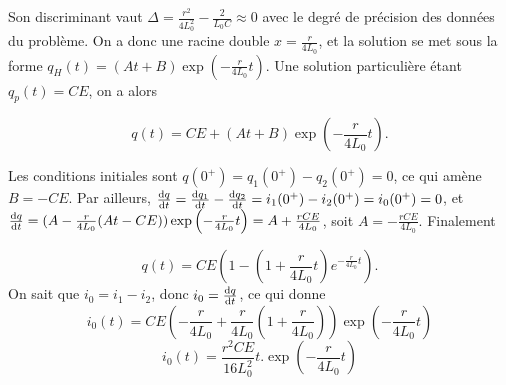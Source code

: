 \begin{solution}
\begin{questions}
                Son discriminant vaut $\Delta = \frac{r^2}{4L_0^2}-\frac{2}{L_0C} \approx 0$ avec le degré de précision des données du problème. On a donc une racine double $x=\frac{r}{4L_0}$, et la solution se met sous la forme $q_H(t) = (At+B)\exp\left(-\frac{r}{4L_0}t\right)$. Une solution particulière étant $q_p(t)=CE$, on a alors 

                \begin{equation}
                q(t) = CE+(At+B)\exp\left(-\frac{r}{4L_0}t\right).
                \end{equation}

                Les conditions initiales sont $q(0^+) = q_1(0^+)-q_2(0^+) = 0$, ce qui amène $B=-CE$. Par ailleurs, $\dv{q}{t}(0^+) = \dv{q_1}{t}(0^+)-\dv{q_2}{t}(0^+) = i_1(0^+)-i_2(0^+) = i_0(0^+) = 0$, et $\dv{q}{t} = (A-\frac{r}{4L_0}(At-CE))\exp\left(-\frac{r}{4L_0}t\right) = A+\frac{rCE}{4L_0}$, soit $A=-\frac{rCE}{4L_0}$. Finalement 

                \begin{equation}
                q(t) = CE\left(1-(1+\frac{r}{4L_0}t)e^{-\frac{r}{4L_0}t}\right).
                \end{equation}
    \question On sait que $i_0 = i_1-i_2$, donc $i_0=\dv{q}{t}$, ce qui donne
                \begin{equation}
                    i_0(t)=CE\left(-\frac{r}{4L_0}+\frac{r}{4L_0}(1+\frac{r}{4L_0})\right)\exp(-\frac{r}{4L_0}t)
                \end{equation}
                \begin{equation}
                \boxed{i_0(t) =\frac{r^2CE}{16L_0^2}t.\exp\left(-\frac{r}{4L_0}t\right)}
                \end{equation}
\end{questions}

\end{solution}